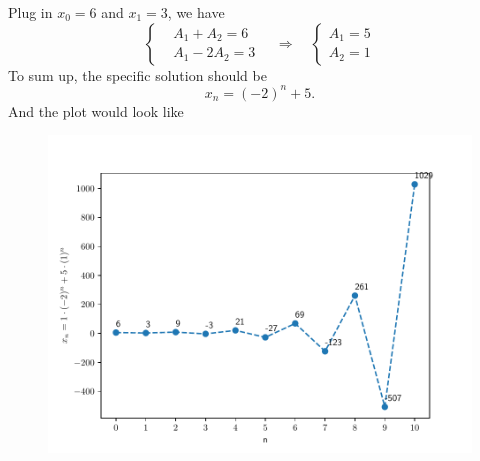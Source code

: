 \begin{homeworkProblem}
\begin{enumerate}
\[        \]
        Plug in $x_0 = 6$ and $x_1 = 3$, we have \[
            \left\{
            \begin{aligned}
                &A_1 + A_2  = 6\\
                &A_1 - 2A_2 = 3
            \end{aligned}
            \right.
            \quad
            \Rightarrow
            \quad
            \left\{
            \begin{aligned}
                A_1 = 5\\
                A_2 = 1
            \end{aligned}
            \right.
        \]
        To sum up, the specific solution should be $$
            x_n = (-2)^n + 5.
        $$
        And the plot would look like
        \begin{figure}[H]
            \centering
            \includegraphics[scale=0.5]{fig/fig2(e).pdf}
        \end{figure}
    \end{enumerate}
    
    \end{homeworkProblem}
    